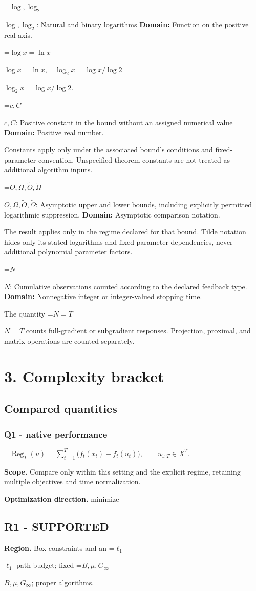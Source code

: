 \documentclass[10pt,a4paper]{article}
\newcommand{\AtlasMath}[1]{\par\begingroup\centering\setbox0=\hbox{$\displaystyle #1$}\ifdim\wd0>1.4\linewidth\typeout{ATLAS WIDE FORMULA: \the\wd0}\fi\ifdim\wd0>\linewidth\resizebox{\linewidth}{!}{\box0}\else\box0\fi\par\endgroup}
\newcommand{\AtlasInlineMath}[1]{\begingroup\setbox0=\hbox{$#1$}\ifdim\wd0>.4\linewidth\endgroup\AtlasMath{#1}\else\endgroup$#1$\fi}
\begin{document}
\AtlasInlineMath{\log,\log_2}: Natural and binary logarithms \textbf{Domain:} Function on the positive real axis.

\AtlasInlineMath{\log x=\ln x}, \AtlasInlineMath{\log_2x=\log x/\log2}.

\AtlasInlineMath{c,C}: Positive constant in the bound without an assigned numerical value \textbf{Domain:} Positive real number.

Constants apply only under the associated bound’s conditions and fixed-parameter convention. Unspecified theorem constants are not treated as additional algorithm inputs.

\AtlasInlineMath{O,\Omega,\widetilde O,\widetilde\Omega}: Asymptotic upper and lower bounds, including explicitly permitted logarithmic suppression. \textbf{Domain:} Asymptotic comparison notation.

The result applies only in the regime declared for that bound. Tilde notation hides only its stated logarithms and fixed-parameter dependencies, never additional polynomial parameter factors.

\AtlasInlineMath{N}: Cumulative observations counted according to the declared feedback type. \textbf{Domain:} Nonnegative integer or integer-valued stopping time.

The quantity \AtlasInlineMath{N=T} counts full-gradient or subgradient responses. Projection, proximal, and matrix operations are counted separately.

\section{3. Complexity bracket}
\subsection{Compared quantities}
\subsubsection{Q1 - native performance}
\AtlasMath{\operatorname{Reg}_T(u)=\sum_{t=1}^{T}\bigl(f_t(x_t)-f_t(u_t)\bigr),\qquad u_{1:T}\in X^T.}
\textbf{Scope.} Compare only within this setting and the explicit regime, retaining multiple objectives and time normalization.

\textbf{Optimization direction.} minimize

\subsection{R1 - SUPPORTED}
\textbf{Region.} Box constraints and an \AtlasInlineMath{\ell_1} path budget; fixed \AtlasInlineMath{B,\mu,G_\infty}; proper algorithms.
\end{document}
